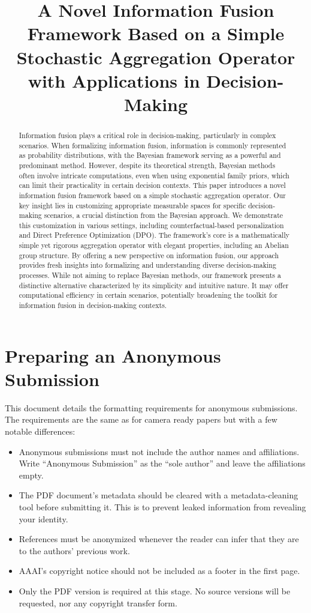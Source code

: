 \documentclass[letterpaper]{article} %
\title{A Novel Information Fusion Framework Based on a Simple Stochastic Aggregation Operator with Applications in Decision-Making}
\begin{document}
\maketitle

\begin{abstract}
Information fusion plays a critical role in decision-making, particularly in complex scenarios. When formalizing information fusion, information is commonly represented as probability distributions, with the Bayesian framework serving as a powerful and predominant method. However, despite its theoretical strength, Bayesian methods often involve intricate computations, even when using exponential family priors, which can limit their practicality in certain decision contexts. This paper introduces a novel information fusion framework based on a simple stochastic aggregation operator. Our key insight lies in customizing appropriate measurable spaces for specific decision-making scenarios, a crucial distinction from the Bayesian approach. We demonstrate this customization in various settings, including counterfactual-based personalization and Direct Preference Optimization (DPO). The framework's core is a mathematically simple yet rigorous aggregation operator with elegant properties, including an Abelian group structure. By offering a new perspective on information fusion, our approach provides fresh insights into formalizing and understanding diverse decision-making processes. While not aiming to replace Bayesian methods, our framework presents a distinctive alternative characterized by its simplicity and intuitive nature. It may offer computational efficiency in certain scenarios, potentially broadening the toolkit for information fusion in decision-making contexts.
\end{abstract}


\section{Preparing an Anonymous Submission}

This document details the formatting requirements for anonymous submissions. The requirements are the same as for camera ready papers but with a few notable differences:

\begin{itemize}
    \item Anonymous submissions must not include the author names and affiliations. Write ``Anonymous Submission'' as the ``sole author'' and leave the affiliations empty.
    \item The PDF document's metadata should be cleared with a metadata-cleaning tool before submitting it. This is to prevent leaked information from revealing your identity.
    \item References must be anonymized whenever the reader can infer that they are to the authors' previous work.
    \item AAAI's copyright notice should not be included as a footer in the first page.
    \item Only the PDF version is required at this stage. No source versions will be requested, nor any copyright transfer form.
\end{itemize}
\end{document}
